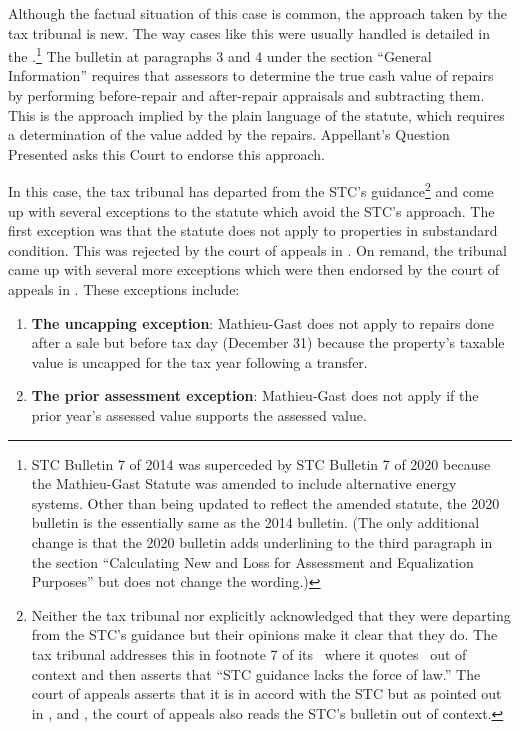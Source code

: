 \documentclass[12pt,\documentclassflag]{michiganCourtOfAppealsBrief}
\begin{document}
Although the factual situation of this case is common, the approach taken by the tax tribunal is new. The way cases like this were usually handled is detailed in the \cite{STC Bulletin 7 of 2014}.\footnote{STC Bulletin 7 of 2014 was superceded by STC Bulletin 7 of 2020 because the Mathieu-Gast Statute was amended to include alternative energy systems. Other than being updated to reflect the amended statute, the 2020 bulletin is the essentially same as the 2014 bulletin. (The only additional change is that the 2020 bulletin adds underlining to the third paragraph in the section ``Calculating New and Loss for Assessment and Equalization Purposes'' but does not change the wording.)} The bulletin at paragraphs 3 and 4 under the section ``General Information'' requires that assessors to determine the true cash value of repairs by performing before-repair and after-repair appraisals and subtracting them. This is the approach implied by the plain language of the statute, which requires a determination of the value added by the repairs. Appellant's Question Presented asks this Court to endorse this approach. 

In this case, the tax tribunal has departed from the STC's guidance\footnote{Neither the tax tribunal nor explicitly acknowledged that they were departing from the STC's guidance but their opinions make it clear that they do. The tax tribunal addresses this in footnote 7 of its \cite{Tribunal's Denial of Reconsideration 2}\ where it quotes \cite{STC Bulletin 7 of 2014}\ out of context and then asserts that ``STC guidance lacks the force of law.'' The court of appeals asserts that it is in accord with the STC but as pointed out in , and , the court of appeals also reads the STC's bulletin out of context.}
and come up with several exceptions to the statute which avoid the STC's approach. The first exception was that the statute does not apply to properties in substandard condition. This was rejected by the court of appeals in \cite{Patru I}. On remand, the tribunal came up with several more exceptions which were then endorsed by the court of appeals in \cite{Patru II}. These exceptions include: 

\begin{enumerate}
\item {\bfseries The uncapping exception}: Mathieu-Gast does not apply to repairs done after a sale but before tax day (December 31) because the property's taxable value is uncapped for the tax year following a transfer.
\item {\bfseries The prior assessment exception}: Mathieu-Gast does not apply if the prior year's assessed value supports the assessed value.
\end{enumerate}
\end{document}
